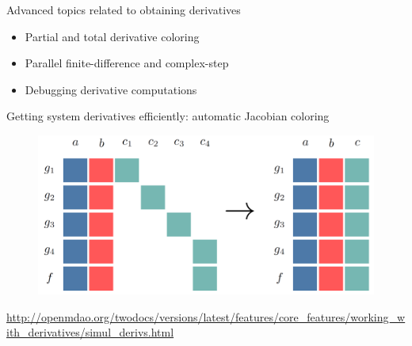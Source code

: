 \documentclass[aspectratio=169, usenames, dvipsnames, 14pt]{beamer}
\begin{document}
\begin{frame}{Advanced topics related to obtaining derivatives}

	\begin{itemize}
		\item Partial and total derivative coloring
		\item Parallel finite-difference and complex-step
		\item Debugging derivative computations
	\end{itemize}
	
\end{frame}    

\begin{frame}{Getting system derivatives efficiently: automatic Jacobian coloring}
	\begin{figure}
		\includegraphics[scale=0.35]{images/slide_120.png}
	\end{figure}
	\url{http://openmdao.org/twodocs/versions/latest/features/core_features/working_with_derivatives/simul_derivs.html}
\end{frame} 
\end{document}
